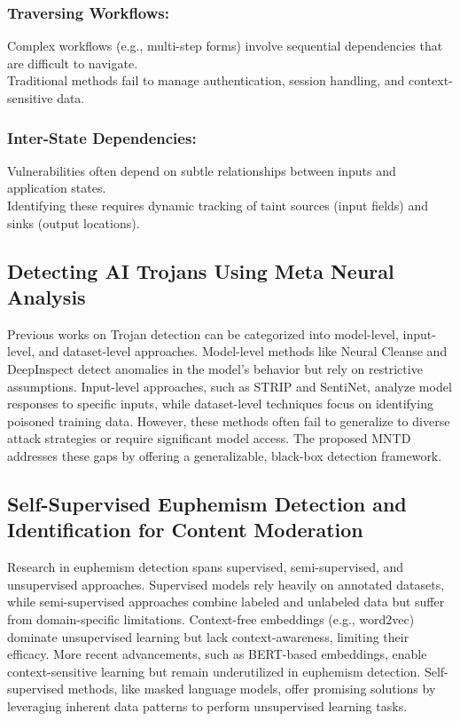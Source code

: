 \documentclass[conference]{IEEEtran}
\begin{document}
\subsubsection{Traversing Workflows:}
Complex workflows (e.g., multi-step forms) involve sequential dependencies that are difficult to navigate.\\
Traditional methods fail to manage authentication, session handling, and context-sensitive data.
\subsubsection{Inter-State Dependencies:}
Vulnerabilities often depend on subtle relationships between inputs and application states.\\
Identifying these requires dynamic tracking of taint sources (input fields) and sinks (output locations).
\subsection{\textbf{Detecting AI Trojans Using Meta Neural Analysis}}
Previous works on Trojan detection can be categorized into model-level, input-level, and dataset-level approaches. Model-level methods like Neural Cleanse and DeepInspect detect anomalies in the model’s behavior but rely on restrictive assumptions. Input-level approaches, such as STRIP and SentiNet, analyze model responses to specific inputs, while dataset-level techniques focus on identifying poisoned training data. However, these methods often fail to generalize to diverse attack strategies or require significant model access. The proposed MNTD addresses these gaps by offering a generalizable, black-box detection framework.
\subsection{\textbf{Self-Supervised Euphemism Detection and Identification for Content Moderation}}
Research in euphemism detection spans supervised, semi-supervised, and unsupervised approaches. Supervised models rely heavily on annotated datasets, while semi-supervised approaches combine labeled and unlabeled data but suffer from domain-specific limitations. Context-free embeddings (e.g., word2vec) dominate unsupervised learning but lack context-awareness, limiting their efficacy. More recent advancements, such as BERT-based embeddings, enable context-sensitive learning but remain underutilized in euphemism detection. Self-supervised methods, like masked language models, offer promising solutions by leveraging inherent data patterns to perform unsupervised learning tasks.
\end{document}
